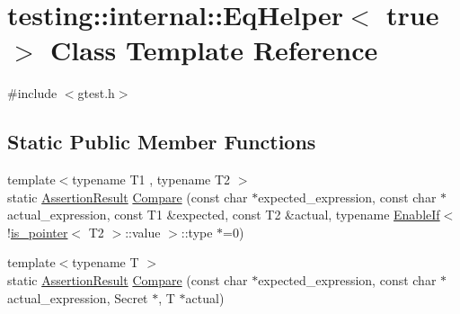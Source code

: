 \hypertarget{classtesting_1_1internal_1_1_eq_helper_3_01true_01_4}{\section{testing\+:\+:internal\+:\+:Eq\+Helper$<$ true $>$ Class Template Reference}
\label{classtesting_1_1internal_1_1_eq_helper_3_01true_01_4}
}


{\ttfamily \#include $<$gtest.\+h$>$}

\subsection*{Static Public Member Functions}
\begin{DoxyCompactItemize}
\item 
{\footnotesize template$<$typename T1 , typename T2 $>$ }\\static \hyperlink{classtesting_1_1_assertion_result}{Assertion\+Result} \hyperlink{classtesting_1_1internal_1_1_eq_helper_3_01true_01_4_a70d6d7e3cb1df06ad6114f25e843fd6d}{Compare} (const char $\ast$expected\+\_\+expression, const char $\ast$actual\+\_\+expression, const T1 \&expected, const T2 \&actual, typename \hyperlink{structtesting_1_1internal_1_1_enable_if}{Enable\+If}$<$!\hyperlink{structtesting_1_1internal_1_1is__pointer}{is\+\_\+pointer}$<$ T2 $>$\+::value $>$\+::type $\ast$=0)
\item 
{\footnotesize template$<$typename T $>$ }\\static \hyperlink{classtesting_1_1_assertion_result}{Assertion\+Result} \hyperlink{classtesting_1_1internal_1_1_eq_helper_3_01true_01_4_ab38e840297adb48f18767a1a99187fb3}{Compare} (const char $\ast$expected\+\_\+expression, const char $\ast$actual\+\_\+expression, Secret $\ast$, T $\ast$actual)
\end{DoxyCompactItemize}



